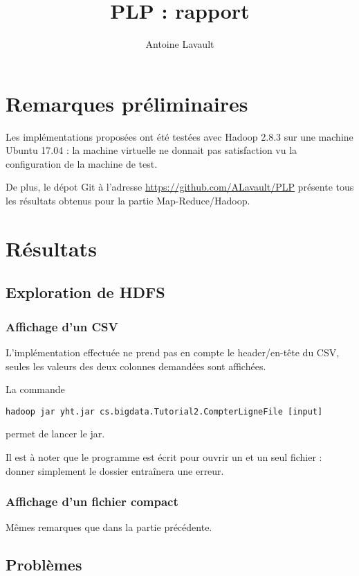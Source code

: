 \documentclass[french]{article}
\title{PLP : rapport}
\author{Antoine Lavault}
\begin{document}
\maketitle

\section*{Remarques préliminaires}

Les implémentations proposées ont été testées avec Hadoop 2.8.3 sur une machine Ubuntu 17.04 : la machine virtuelle ne donnait pas satisfaction vu la configuration de la machine de test.

De plus, le dépot Git à l'adresse \href{https://github.com/ALavault/PLP}{https://github.com/ALavault/PLP} présente tous les résultats obtenus pour la partie Map-Reduce/Hadoop.



\section{Résultats}
\subsection{Exploration de HDFS}
\subsubsection{Affichage d'un CSV}

L'implémentation effectuée ne prend pas en compte le header/en-tête du CSV, seules les valeurs des deux colonnes demandées sont affichées.

La commande
 \begin{verbatim}
hadoop jar yht.jar cs.bigdata.Tutorial2.CompterLigneFile [input] 
\end{verbatim} 

permet de lancer le jar.

Il est à noter que le programme est écrit pour ouvrir un et un seul fichier : donner simplement le dossier entraînera une erreur.

\subsubsection{Affichage d'un fichier compact}

Mêmes remarques que dans la partie précédente.



\subsection{Problèmes}
\end{document}
